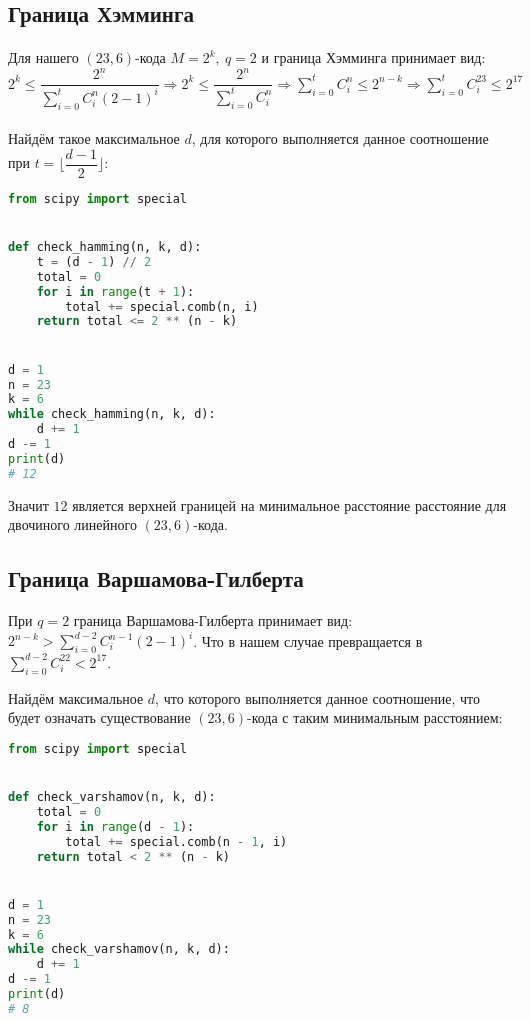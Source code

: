 \documentclass[fontsize=14pt]{article}
\begin{document}
\subsection*{Граница Хэмминга}

\paragraph*{}
Для нашего $(23, 6)$-кода $M = 2^k,\ q = 2$ и граница Хэмминга принимает вид: $2^k \leq \dfrac{2^n}{\sum\limits_{i = 0}^t C_i^n \left(2 - 1
\right) ^ i} 
\Rightarrow 
2^k \leq \dfrac{2^n}{\sum\limits_{i = 0}^t C_i^n}
\Rightarrow
\sum\limits_{i = 0}^t C_i^n \leq 2^{n - k}
\Rightarrow
\sum\limits_{i = 0}^t C_i^{23} \leq 2^{17}
$

\paragraph*{}
Найдём такое максимальное $d$, для которого выполняется данное соотношение при $t = \lfloor \dfrac{d - 1}{2} \rfloor$:

\begin{lstlisting}[frame=single, language=Python]
from scipy import special


def check_hamming(n, k, d):
    t = (d - 1) // 2
    total = 0
    for i in range(t + 1):
        total += special.comb(n, i)
    return total <= 2 ** (n - k)


d = 1
n = 23
k = 6
while check_hamming(n, k, d):
    d += 1
d -= 1
print(d)
# 12	
\end{lstlisting}

Значит $12$ является верхней границей на минимальное расстояние расстояние для двочиного линейного $(23, 6)$-кода.

\subsection*{Граница Варшамова-Гилберта}

При $q = 2$ граница Варшамова-Гилберта принимает вид: $2^{n - k} > \sum\limits_{i = 0}^{d - 2} C_i^{n - 1}(2 - 1)^i$. Что в нашем случае превращается в $\sum\limits_{i = 0}^{d - 2} C_i^{22} < 2^{17}$.
 
Найдём максимальное $d$, что которого выполняется данное соотношение, что будет означать существование $(23, 6)$-кода с таким минимальным расстоянием:

\begin{lstlisting}[frame=single, language=Python]
from scipy import special


def check_varshamov(n, k, d):
    total = 0
    for i in range(d - 1):
        total += special.comb(n - 1, i)
    return total < 2 ** (n - k)


d = 1
n = 23
k = 6
while check_varshamov(n, k, d):
    d += 1
d -= 1
print(d)
# 8
\end{lstlisting}
\end{document}
